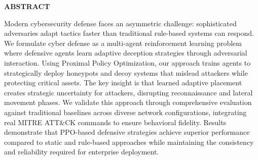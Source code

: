 \documentclass[12pt,oneside]{article}
\begin{document}



\tableofcontents
\clearpage  %

\begin{center}
\large\textbf{ABSTRACT}
\end{center}

\vspace{1em} %

Modern cybersecurity defense faces an asymmetric challenge: sophisticated adversaries adapt tactics faster than traditional rule-based systems can respond. We formulate cyber defense as a multi-agent reinforcement learning problem where defensive agents learn adaptive deception strategies through adversarial interaction. Using Proximal Policy Optimization, our approach trains agents to strategically deploy honeypots and decoy systems that mislead attackers while protecting critical assets. The key insight is that learned adaptive placement creates strategic uncertainty for attackers, disrupting reconnaissance and lateral movement phases. We validate this approach through comprehensive evaluation against traditional baselines across diverse network configurations, integrating real MITRE ATT\&CK commands to ensure behavioral fidelity. Results demonstrate that PPO-based defensive strategies achieve superior performance compared to static and rule-based approaches while maintaining the consistency and reliability required for enterprise deployment.

\end{document}
